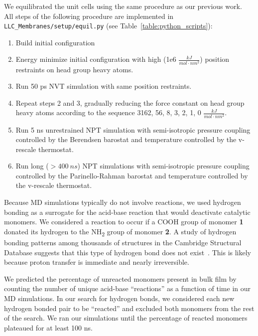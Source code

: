 \documentclass{article}
\begin{document}
  We equilibrated the unit cells using the same procedure as our previous
  work.~\cite{coscia_understanding_2019} All steps of the following
  procedure are implemented in \texttt{LLC\_Membranes/setup/equil.py} 
  (see Table~\ref{table:python_scripts}):
  \begin{enumerate}
  	\item Build initial configuration
  	\item Energy minimize initial configuration with high (1e6 $\frac{kJ}{mol \cdot nm^2}$)
  	position restraints on head group heavy atoms. 
  	\item Run 50 ps NVT simulation with same position restraints.
  	\item Repeat steps 2 and 3, gradually reducing the force constant on head
  	group heavy atoms according to the sequence 3162, 56, 8, 3, 2, 1, 0 $\frac{kJ}{mol \cdot nm^2}$.
  	\item Run 5 ns unrestrained NPT simulation with semi-isotropic pressure 
  	coupling controlled by the Berendsen barostat and temperature controlled by the 
  	v-rescale thermostat.
  	\item Run long ($> 400~ns$) NPT simulations with semi-isotropic pressure
  	coupling controlled by the Parinello-Rahman barostat and temperature controlled by
  	the v-rescale thermostat.
  \end{enumerate}
  
  Because MD simulations typically do not involve reactions, we used hydrogen
  bonding as a surrogate for the acid-base reaction that would deactivate
  catalytic monomers. We considered a reaction to occur if a COOH group of monomer
  \textbf{1} donated its hydrogen to the NH\textsubscript{2} group of monomer
  \textbf{2}. A study of hydrogen bonding patterns among thousands of structures 
  in the Cambridge Structural Database suggests that this type of hydrogen
  bond does not exist~\cite{gilli_predicting_2009}. This is likely because proton
  transfer is immediate and nearly irreversible. %
  
  We predicted the percentage of unreacted monomers present in bulk film by
  counting the number of unique acid-base ``reactions'' as a function of time in 
  our MD simulations. In our search for hydrogen bonds, we considered each new 
  hydrogen bonded pair to be ``reacted'' and excluded both monomers from the rest
  of the search. We ran our simulations until the percentage of reacted monomers 
  plateaued for at least 100 ns.
  
\end{document}
